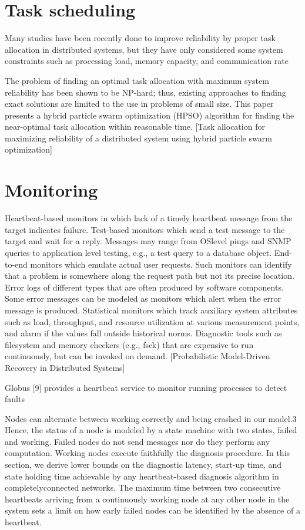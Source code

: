 \documentclass{cslthse-msc}
\begin{document}
\section{Task scheduling}

\cite{schedReplicas}

Many studies have been recently done to improve reliability by proper task allocation in distributed systems, but they have only considered some system constraints such as processing load, memory capacity, and communication rate \cite{optTaskAllocationForMaxRel}

The problem of finding an optimal task allocation with maximum system reliability has been shown to be NP-hard; thus, existing approaches to finding exact solutions are limited to the use in problems of small size. This paper presents a hybrid particle swarm optimization (HPSO) algorithm for finding the near-optimal task allocation within reasonable time. [Task allocation for maximizing reliability of a distributed system using hybrid particle swarm optimization]

\section{Monitoring}
Heartbeat-based monitors in which lack of a timely heartbeat message from the target indicates failure.
Test-based monitors which send a test message to the target and wait for a reply. Messages may range from OSlevel pings and SNMP queries to application level testing, e.g., a test query to a database object.
End-to-end monitors which emulate actual user requests. Such monitors can identify that a problem is somewhere along the request path but not its precise location.
Error logs of different types that are often produced by software components. Some error messages can be modeled as monitors which alert when the error message is produced.
Statistical monitors which track auxiliary system attributes such as load, throughput, and resource utilization at various measurement points, and alarm if the values fall outside historical norms.
Diagnostic tools such as filesystem and memory checkers (e.g., fsck) that are expensive to run continuously, but can be invoked on demand. [Probabilistic Model-Driven Recovery in Distributed Systems]


Globus [9] provides a heartbeat service to monitor running processes to detect faults  \cite{effTaskReplMobGrid}

Nodes can alternate between working correctly and being crashed in our model.3 Hence, the status of a node is modeled by a state machine with two states, failed and working. Failed nodes do not send messages nor do they perform any computation. Working nodes execute faithfully the diagnosis procedure. In this section, we derive lower bounds on the diagnostic
latency, start-up time, and state holding time achievable by any heartbeat-based diagnosis algorithm in completelyconnected networks. The maximum time between two consecutive heartbeats arriving from a continuously working node at any other node in the system sets a limit on how early failed nodes can be identified by the absence of a heartbeat. \cite{distDiagnosis}
\end{document}
